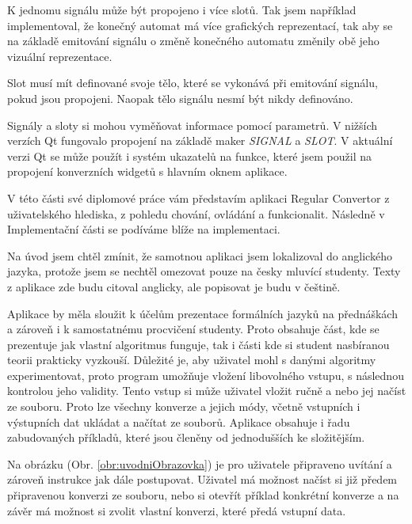 K jednomu signálu může být propojeno i více slotů. Tak jsem například implementoval, že konečný automat má více grafických reprezentací, tak aby se na základě emitování signálu o změně konečného automatu změnily obě jeho vizuální reprezentace.

Slot musí mít definované svoje tělo, které se vykonává při emitování signálu, pokud jsou propojeni. Naopak tělo signálu nesmí být nikdy definováno.

Signály a sloty si mohou vyměňovat informace pomocí parametrů. V nižších verzích Qt fungovalo propojení na základě maker \textit{SIGNAL} a \textit{SLOT}. V aktuální verzi Qt se může použít i systém ukazatelů na funkce, které jsem použil na propojení konverzních widgetů s hlavním oknem aplikace.



V této části své diplomové práce vám představím aplikaci Regular Convertor z uživatelského hlediska, z pohledu chování, ovládání a funkcionalit. Následně v Implementační části se podíváme blíže na implementaci. 

Na úvod jsem chtěl zmínit, že samotnou aplikaci jsem lokalizoval do anglického jazyka, protože jsem se nechtěl omezovat pouze na česky mluvící studenty.
Texty z aplikace zde budu citoval anglicky, ale popisovat je budu v češtině. 

Aplikace by měla sloužit k účelům prezentace formálních jazyků na přednáškách a zároveň i k samostatnému procvičení studenty. Proto obsahuje část, kde se prezentuje jak vlastní algoritmus funguje, tak i části kde si student nasbíranou teorii prakticky vyzkouší. Důležité je, aby uživatel mohl s danými algoritmy experimentovat, proto program umožňuje vložení libovolného vstupu, s následnou kontrolou jeho validity. Tento vstup si může uživatel vložit ručně a nebo jej načíst ze souboru. Proto lze všechny konverze a jejich módy, včetně vstupních i výstupních dat ukládat a načítat ze souborů. Aplikace obsahuje i řadu zabudovaných příkladů, které jsou členěny od jednodušších ke složitějším.


Na obrázku (Obr. \ref{obr:uvodniObrazovka}) je pro uživatele připraveno uvítání a zároveň instrukce jak dále postupovat. Uživatel má možnost načíst si již předem připravenou konverzi ze souboru, nebo si otevřít příklad konkrétní konverze a na závěr má možnost si zvolit vlastní konverzi, které předá vstupní data.

